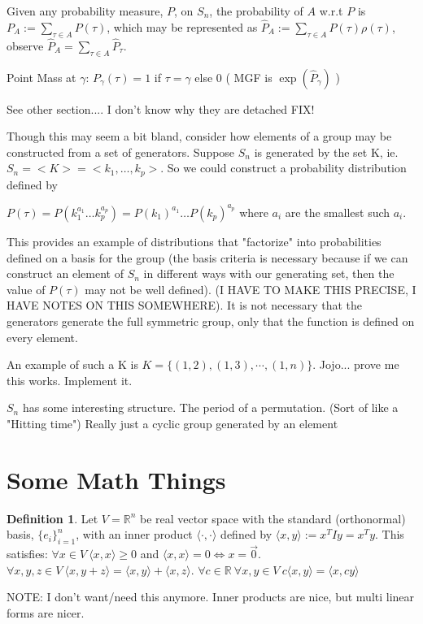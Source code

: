 \documentclass{article}
\theoremstyle{definition}
\newtheorem{definition}{Definition}
\begin{document}
Given any probability measure, $P$, on $S_n$, the probability of $A$ w.r.t $P$ is $ P_A  := \sum_{\tau \in A} P(\tau) $, which may be represented as $\hat{P}_A := \sum_{\tau \in A} P(\tau) \rho(\tau) $, observe $\hat{P}_A = \sum_{\tau \in A} \hat{P}_\tau $. 

Point Mass at $\gamma$: $ P_\gamma(\tau) = 1 $ if $\tau = \gamma$ else 0
( MGF is $\exp(\hat{P}_\gamma)$ )

See other section.... I don't know why they are detached FIX!

Though this may seem a bit bland, consider how elements of a group may be constructed from a set of generators. Suppose $S_n$ is generated by the set K, ie. $S_n = < K > = <k_1, \dots, k_p >$. So we could construct a probability distribution defined by

\( P(\tau) = P( k_1^{a_1} \dots k_p^{a_p}) = P( k_1)^{a_1}\dots P(k_p )^{a_p} \) where $a_i$ are the smallest such $a_i$.

This provides an example of distributions that "factorize" into probabilities defined on a basis for the group (the basis criteria is necessary because if we can construct an element of $S_n$ in different ways with our generating set, then the value of $P(\tau)$ may not be well defined). (I HAVE TO MAKE THIS PRECISE, I HAVE NOTES ON THIS SOMEWHERE). It is not necessary that the generators generate the full symmetric group, only that the function is defined on every element.

An example of such a K is $K= \{(1,2), (1,3), \cdots, (1,n) \}$. Jojo... prove me this works. Implement it.

$S_n$ has some interesting structure.
The period of a permutation. (Sort of like a "Hitting time")
Really just a cyclic group generated by an element

\section{Some Math Things}
\begin{definition}
Let $V=\mathbb{R}^n$ be real vector space with the standard (orthonormal) basis, $\{e_i\}_{i=1}^n$, with an inner product $\langle \cdot,\cdot \rangle$ defined by $\langle x,y\rangle := x^T Iy = x^Ty$. This satisfies:
$\forall x \in V \: \langle x,x \rangle \geq 0 $ and $\langle x,x\rangle=0 \iff x=\vec{0} $.
$\forall x,y,z \in V \: \langle x,y+z \rangle= \langle x,y \rangle +  \langle x,z \rangle$.
$\forall c \in \mathbb{R} \: \forall x,y \in V \: c\langle x,y \rangle=\langle x,cy \rangle$
\end{definition}
NOTE: I don't want/need this anymore. Inner products are nice, but multi linear forms are nicer.
\end{document}
